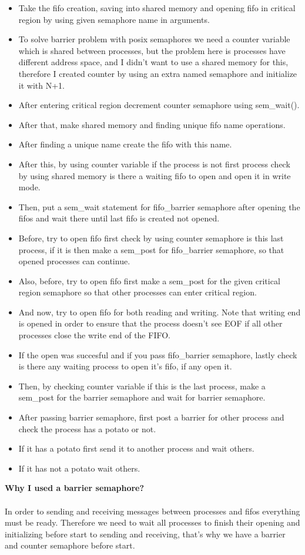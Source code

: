 \documentclass{article}
\begin{document}
\begin{itemize}
	\item Take the fifo creation, saving into shared memory and opening fifo in critical region by using given semaphore name in arguments.
	\item To solve barrier problem with posix semaphores we need a counter variable which is shared between processes, but the problem here is processes have
	different address space, and I didn't want to use a shared memory for this, therefore I created counter by using an extra named semaphore and initialize it 
	with N+1.
	\item After entering critical region decrement counter semaphore using sem\_wait().
	\item After that, make shared memory and finding unique fifo name operations.
	\item After finding a unique name create the fifo with this name.
	\item After this, by using counter variable if the process is not first process check by using shared memory is there a waiting fifo to open
 	and open it in write mode.
 	\item Then, put a sem\_wait statement for fifo\_barrier semaphore after opening the fifos and wait there until last fifo is created not opened.
 	\item Before, try to open fifo first check by using counter semaphore is this last process, if it is then make a sem\_post for fifo\_barrier semaphore,
 	so that opened processes can continue.
 	\item Also, before, try to open fifo first make a sem\_post for the given critical region semaphore so that other processes can enter critical region.
 	\item And now, try to open fifo for both reading and writing. Note that writing end is opened in order to ensure that the process doesn’t see EOF if all other
 	processes close the write end of the FIFO.
 	\item If the open was succesful and if you pass fifo\_barrier semaphore, lastly check is there any waiting process 
    to open it's fifo, if any open it.
 	\item Then, by checking counter variable if this is the last process, make a  sem\_post for the barrier semaphore and wait for barrier semaphore.
 	\item After passing barrier semaphore, first post a barrier for other process and check the process has a potato or not.
 	\item If it has a potato first send it to another process and wait others.
 	\item If it has not a potato wait others.
\end{itemize}
\textbf{Why I used a barrier semaphore?} \\ \\
In order to sending and receiving messages between processes and fifos everything must be ready. Therefore we need to wait all processes to finish 
their opening and initializing before start to sending and receiving, that's why we have a barrier and counter semaphore before start.
\end{document}

